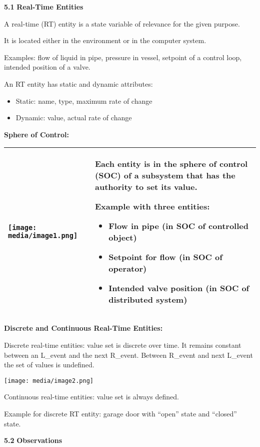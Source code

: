 \textbf{5.1} \protect\hypertarget{teil2}{}{}\textbf{Real-Time Entities}

A real-time (RT) entity is a state variable of relevance for the given
purpose.

It is located either in the environment or in the computer system.

Examples: flow of liquid in pipe, pressure in vessel, setpoint of a
control loop, intended position of a valve.

An RT entity has static and dynamic attributes:

\begin{itemize}
\item
  Static: name, type, maximum rate of change
\item
  Dynamic: value, actual rate of change
\end{itemize}

\textbf{Sphere of Control:}

\begin{longtable}[c]{@{}ll@{}}
\toprule
\texttt{[image: media/image1.png]} &
Each entity is in the sphere of control (SOC) of a subsystem that has
the authority to set its value.

Example with three entities:

\begin{itemize}
\item
  Flow in pipe (in SOC of controlled object)
\item
  Setpoint for flow (in SOC of operator)
\item
  Intended valve position (in SOC of distributed system)
\end{itemize}\tabularnewline
\bottomrule
\end{longtable}

\textbf{Discrete and Continuous Real-Time Entities:}

Discrete real-time entities: value set is discrete over time. It remains
constant between an L\_event and the next R\_event. Between R\_event and
next L\_event the set of values is undefined.

\texttt{[image: media/image2.png]}

Continuous real-time entities: value set is always defined.

Example for discrete RT entity: garage door with ``open'' state and
``closed'' state.

\textbf{5.2} \protect\hypertarget{teil3}{}{}\textbf{Observations }

